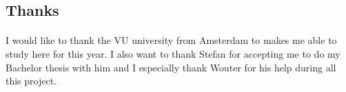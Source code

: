 \documentclass{article}
\begin{document}
	\subsection{Thanks}
		\paragraph{}
			I would like to thank the VU university from Amsterdam to makes me able to study here for this year.
			I also want to thank Stefan for accepting me to do my Bachelor thesis with him
			and I especially thank Wouter for his help during all this project.

\newpage


\end{document}
